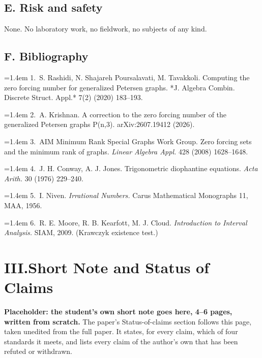 \documentclass[11pt]{article}
\begin{document}
\subsection*{E. Risk and safety}

None. No laboratory work, no fieldwork, no subjects of any kind.

\subsection*{F. Bibliography}

\par\hangindent=1.4em 1.~S. Rashidi, N. Shajareh Poursalavati, M. Tavakkoli. Computing the zero forcing
   number for generalized Petersen graphs. *J. Algebra Combin. Discrete Struct.
   Appl.* 7(2) (2020) 183–193.
\par\hangindent=1.4em 2.~A. Krishnan. A correction to the zero forcing number of the generalized
   Petersen graphs P(n,3). arXiv:2607.19412 (2026).
\par\hangindent=1.4em 3.~AIM Minimum Rank Special Graphs Work Group. Zero forcing sets and the minimum
   rank of graphs. \emph{Linear Algebra Appl.} 428 (2008) 1628–1648.
\par\hangindent=1.4em 4.~J. H. Conway, A. J. Jones. Trigonometric diophantine equations. \emph{Acta Arith.}
   30 (1976) 229–240.
\par\hangindent=1.4em 5.~I. Niven. \emph{Irrational Numbers.} Carus Mathematical Monographs 11, MAA, 1956.
\par\hangindent=1.4em 6.~R. E. Moore, R. B. Kearfott, M. J. Cloud. \emph{Introduction to Interval Analysis.}
   SIAM, 2009. (Krawczyk existence test.)

\newpage
\hypertarget{sec:paper}{\section*{III.\quad Short Note and Status of Claims \hfill\normalsize\normalfont}}
\textbf{Placeholder: the student's own short note goes here, 4--6 pages, written from scratch.} The paper's Status-of-claims section follows this page, taken unedited from the full paper. It states, for every claim, which of four standards it meets, and lists every claim of the author's own that has been refuted or withdrawn.
\end{document}
